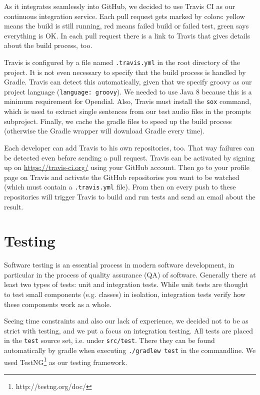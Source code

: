 \documentclass[a4paper, 12pt]{article}
\begin{document}
As it integrates seamlessly into GitHub, we decided to use Travis CI as our continuous integration service. Each pull request gets marked by colors: yellow means the build is still running, red means failed build or failed test, green says everything is OK. In each pull request there is a link to Travis that gives details about the build process, too.

Travis is configured by a file named \texttt{.travis.yml} in the root directory of the project. 
It is not even necessary to specify that the build process is handled by Gradle.
Travis can detect this automatically, given that we specify groovy as our project language (\texttt{language: groovy}).
We needed to use Java 8 because this is a minimum requirement for Opendial.
Also, Travis must install the \texttt{sox} command, which is used to extract single sentences from our test audio files in the prompts subproject.
Finally, we cache the gradle files to speed up the build process (otherwise the Gradle wrapper will download Gradle every time).

Each developer can add Travis to his own repositories, too.
That way failures can be detected even before sending a pull request.
Travis can be activated by signing up on \url{https://travis-ci.org/} using your GitHub account.
Then go to your profile page on Travis and activate the GitHub repositories you want to be watched (which must contain a \texttt{.travis.yml} file).
From then on every push to these repositories will trigger Travis to build and run tests and send an email about the result.

\newpage
\section{Testing}
\label{sec:Testing}
Software testing is an essential process in modern software development, in particular in the process of quality assurance (QA) of software.
Generally there at least two types of tests: unit and integration tests.
While unit tests are thought to test small components (e.g. classes) in isolation, integration tests verify how these components work as a whole.

Seeing time constraints and also our lack of experience, we decided not to be as strict with testing, and we put a focus on integration testing.
All tests are placed in the \texttt{test} source set, i.e. under \texttt{src/test}.
There they can be found automatically by gradle when executing \texttt{./gradlew test} in the commandline.
We used TestNG\footnote{http://testng.org/doc/} as our testing framework.
\end{document}
